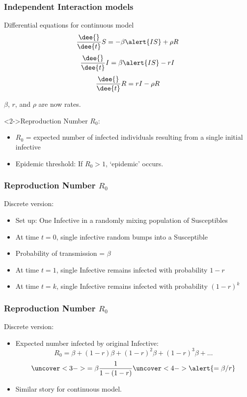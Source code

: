 \begin{frame}
  \frametitle{Independent Interaction models}

  \begin{block}{Differential equations for continuous model}
    $$
    \frac{\dee{}}{\dee{t}} S = - \beta  \alert{I S} + \rho R 
    $$
    $$
    \frac{\dee{}}{\dee{t}} I=  \beta \alert{I S} - r I 
    $$
    $$
    \frac{\dee{}}{\dee{t}} R=  r I - \rho R 
    $$
  \end{block}
  $\beta$, $r$, and $\rho$ are now \alert{rates}.
  
  \begin{block}<2->{Reproduction Number $R_0$:}
  \begin{itemize}
  \item<3-> $R_0$ = expected number of infected individuals resulting
    from a single initial infective
  \item<4-> Epidemic threshold: If $R_0 > 1$, `epidemic' occurs.
  \end{itemize}
  \end{block}

\end{frame}

\begin{frame}
  \frametitle{Reproduction Number $R_0$}

  \begin{block}{Discrete version:}
    \begin{itemize}
    \item<1-> Set up: One Infective in a randomly mixing population of Susceptibles
    \item<2-> At time $t=0$, single infective random bumps into a Susceptible
    \item<3-> Probability of transmission = $\beta$
    \item<4-> At time $t=1$, single Infective remains infected with probability $1-r$
    \item<5-> At time $t=k$, single Infective remains infected with probability $(1-r)^k$
    \end{itemize}
  \end{block}    

\end{frame}

\begin{frame}
  \frametitle{Reproduction Number $R_0$}

  \begin{block}{Discrete version:}
    \begin{itemize}
    \item<1-> Expected number infected by original Infective:
      $$
      R_0 = \beta + (1-r)\beta + (1-r)^2\beta + (1-r)^3\beta + \ldots
      $$
      $$
      \uncover<3->{= \beta \frac{1}{1 - (1-r)}}
      \uncover<4->{\alert{= \beta/r}}
      $$
      \item<5->{Similar story for continuous model.}
    \end{itemize}
  \end{block}

\end{frame}

